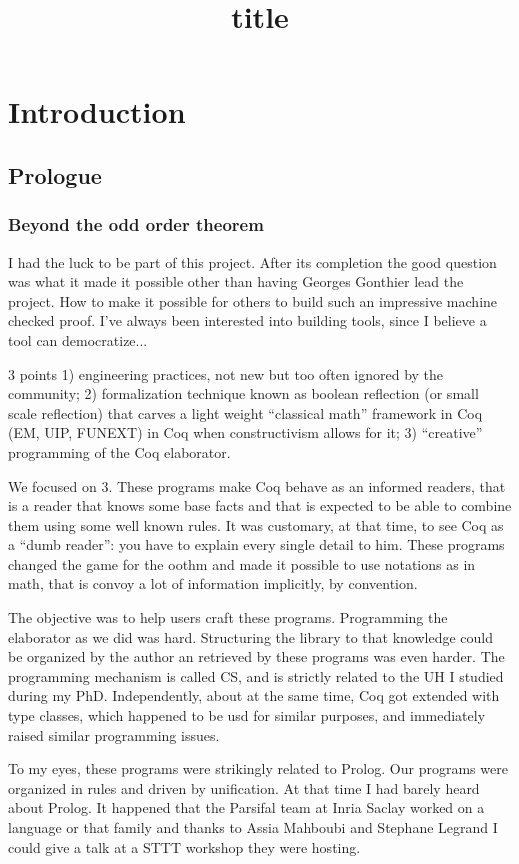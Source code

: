 \documentclass[a4paper, 11pt]{book}
\title{title}
\begin{document}
\setcounter{tocdepth}{4}
\tableofcontents
  
 \chapter{Introduction}


\section{Prologue}

\subsection{Beyond the odd order theorem}

I had the luck to be part of this project.
After its completion the good question was what it made it possible
other than having Georges Gonthier lead the project. How to make
it possible for others to build such an impressive machine checked
proof. I've always been interested into building tools, since I believe
a tool can democratize...

3 points 1) engineering practices, not new but too often
ignored by the community; 2) formalization technique known as boolean
reflection (or small scale reflection) that carves a light weight
``classical math'' framework in Coq (EM, UIP, FUNEXT) in Coq when
constructivism allows for it; 3) ``creative'' programming of the
Coq elaborator.

We focused on 3. These programs make Coq behave as an informed readers,
that is a reader that knows some base facts and that is expected to
be able to combine them using some well known rules. It was customary,
at that time, to see Coq as a ``dumb reader'': you have to explain
every single detail to him. These programs changed the game  for the
oothm and made it possible to use notations as in math, that is convoy
a lot of information implicitly, by convention.

The objective was to help users craft these programs. Programming
the elaborator as we did was hard. Structuring the library to that
knowledge could be organized by the author an retrieved by these
programs was even harder. The programming mechanism is called CS,
and is strictly related to the UH I studied during my PhD.
Independently, about at the same time,
Coq got extended with type classes, which happened to be usd for similar
purposes, and immediately raised similar programming issues.

To my eyes, these programs were strikingly related to Prolog.
Our programs were organized in rules and driven by unification.
At that time I had barely heard about Prolog.
It happened that the Parsifal team
at Inria Saclay worked on a language or that family
and thanks to Assia Mahboubi and Stephane Legrand I could give a talk
at a STTT workshop they were hosting.
\end{document}
